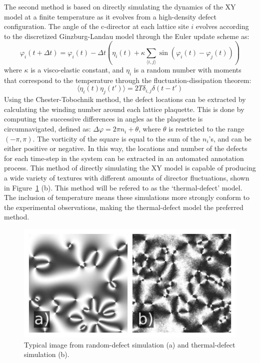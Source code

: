 \documentclass[twoside,twocolumn,9pt]{article}
\begin{document}
The second method is based on directly simulating the dynamics of the XY model at a finite temperature as it evolves from a high-density defect configuration\cite{loft_numerical_1987, yurke_coarsening_1993, jelic_quench_2011}. The angle of the c-director at each lattice site $i$ evolves according to the discretized Ginzburg-Landau model through the Euler update scheme as:
\begin{equation}
    \varphi_i(t+\Delta t) = \varphi_i(t) -\Delta t \left( \eta_i(t) + \kappa \sum_{\langle i,j \rangle} \sin(\varphi_i(t) - \varphi_j(t)) \right)
\end{equation}
where $\kappa$ is a visco-elastic constant, and $\eta_i$ is a random number with moments that correspond to the temperature through the fluctuation-dissipation theorem:
\begin{equation}
    \langle \eta_i(t) \eta_j(t') \rangle  = 2 T \delta_{i,j} \delta(t-t')
\end{equation}
Using the Chester-Tobochnik method\cite{tobochnik_monte_1979}, the defect locations can be extracted by calculating the winding number around each lattice plaquette. This is done by computing the successive differences in angles as the plaquette is circumnavigated, defined as: $\Delta \varphi = 2 \pi n_i+ \theta$, where $\theta$ is restricted to the range $(-\pi,\pi)$. The vorticity of the square is equal to the sum of the $n_i$'s, and can be either positive or negative. In this way, the locations and number of the defects for each time-step in the system can be extracted in an automated annotation process. This method of directly simulating the XY model is capable of producing a wide variety of textures with different amounts of director fluctuations, shown in Figure~\ref{fig:RandomDefect} (b). This method will be refered to as the `thermal-defect' model. The inclusion of temperature means these simulations more strongly conform to the experimental observations, making the thermal-defect model the preferred method.


\begin{figure}
  \includegraphics[width=\linewidth]{simulations.png}
  \caption{Typical image from random-defect simulation (a) and thermal-defect simulation (b). }
  \label{fig:RandomDefect}
\end{figure}
\end{document}
